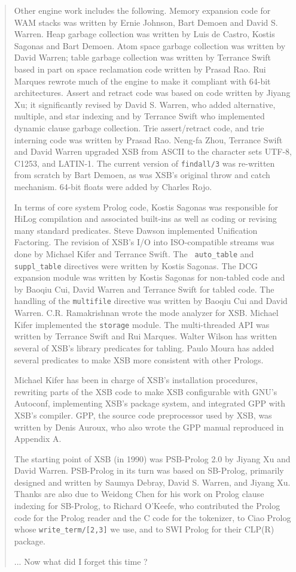 \begin{quote}
Other engine work includes the following.  Memory expansion code for
WAM stacks was written by Ernie Johnson, Bart Demoen and David
S. Warren.  Heap garbage collection was written by Luis de Castro,
Kostis Sagonas and Bart Demoen.  Atom space garbage collection was
written by David Warren; table garbage collection was written by
Terrance Swift based in part on space reclamation code written by
Prasad Rao.  Rui Marques rewrote much of the engine to make it
compliant with 64-bit architectures.  Assert and retract code was
based on code written by Jiyang Xu; it significantly revised by David
S. Warren, who added alternative, multiple, and star indexing and by
Terrance Swift who implemented dynamic clause garbage collection. Trie
assert/retract code, and trie interning code was written by Prasad
Rao.  Neng-fa Zhou, Terrance Swift and David Warren upgraded XSB from
ASCII to the character sets UTF-8, C1253, and LATIN-1.  The current
version of {\tt findall/3} was re-written from scratch by Bart Demoen,
as was XSB's original throw and catch mechanism.  64-bit floats were
added by Charles Rojo.

In terms of core system Prolog code, Kostis Sagonas was responsible
for HiLog compilation and associated built-ins as well as coding or
revising many standard predicates.  Steve Dawson implemented
Unification Factoring.  The revision of XSB's I/O into ISO-compatible
streams was done by Michael Kifer and Terrance Swift.  The {\tt
  auto\_table} and {\tt suppl\_table} directives were written by
Kostis Sagonas.  The DCG expansion module was written by Kostis
Sagonas for non-tabled code and by Baoqiu Cui, David Warren and
Terrance Swift for tabled code.  The handling of the {\tt multifile}
directive was written by Baoqiu Cui and David
Warren. C.R. Ramakrishnan wrote the mode analyzer for XSB.  Michael
Kifer implemented the {\tt storage} module.  The multi-threaded API
was written by Terrance Swift and Rui Marques.  Walter Wilson has
written several of XSB's library predicates for tabling.  Paulo Moura
has added several predicates to make XSB more consistent with other
Prologs.  

Michael Kifer has been in charge of XSB's installation procedures,
rewriting parts of the XSB code to make XSB configurable with GNU's
Autoconf, implementing XSB's package system, and integrated GPP with
XSB's compiler.  GPP, the source code preprocessor used by XSB, was
written by Denis Auroux, who also wrote the GPP manual reproduced in
Appendix A.

The starting point of XSB (in 1990) was PSB-Prolog 2.0 by Jiyang Xu
and David Warren.  PSB-Prolog in its turn was based on SB-Prolog,
primarily designed and written by Saumya Debray, David S. Warren, and
Jiyang Xu.  Thanks are also due to Weidong Chen for his work on Prolog
clause indexing for SB-Prolog, to Richard O'Keefe, who contributed the
Prolog code for the Prolog reader and the C code for the tokenizer, to
Ciao Prolog whose {\tt write\_term/[2,3]} we use, and to SWI Prolog
for their CLP(R) package.

... Now what did I forget this time ?

\end{quote}

